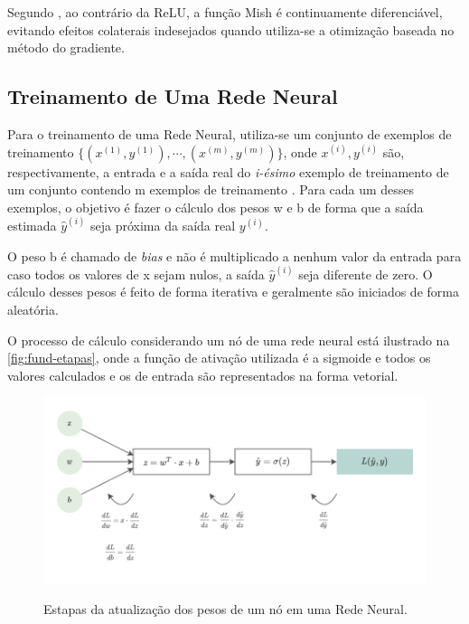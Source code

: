 Segundo , ao contrário da ReLU, a função Mish é continuamente diferenciável, evitando efeitos colaterais indesejados quando utiliza-se a otimização baseada no método do gradiente.

\subsection{Treinamento de Uma Rede Neural}\label{cap:fund-ia-rn-treinamento}

Para o treinamento de uma Rede Neural, utiliza-se um conjunto de exemplos de treinamento $\{(x^{(1)}, y^{(1)}), \cdots, (x^{(m)}, y^{(m)})\}$, onde $x^{(i)}, y^{(i)}$ são, respectivamente, a entrada e a saída real do \textit{i-ésimo} exemplo de treinamento de um conjunto contendo m exemplos de treinamento \cite{ref:Ng}. Para cada um desses exemplos, o objetivo é fazer o cálculo dos pesos w e b de forma que a saída estimada $\hat{y}^{(i)}$ seja próxima da saída real $y^{(i)}$.

O peso b é chamado de \textit{bias} e não é multiplicado a nenhum valor da entrada para caso todos os valores de x sejam nulos, a saída $\hat{y}^{(i)}$ seja diferente de zero. O cálculo desses pesos é feito de forma iterativa e geralmente são iniciados de forma aleatória.

O processo de cálculo considerando um nó de uma rede neural está ilustrado na \autoref{fig:fund-etapas}, onde a função de ativação utilizada é a sigmoide e todos os valores calculados e os de entrada são representados na forma vetorial.

\begin{figure}[h!] %
  \centering
  \caption{Estapas da atualização dos pesos de um nó em uma Rede Neural.}
  \includegraphics[scale=1.1]{img/img-fundamentacao-etapas.pdf}
  \label{fig:fund-etapas}
\end{figure}

